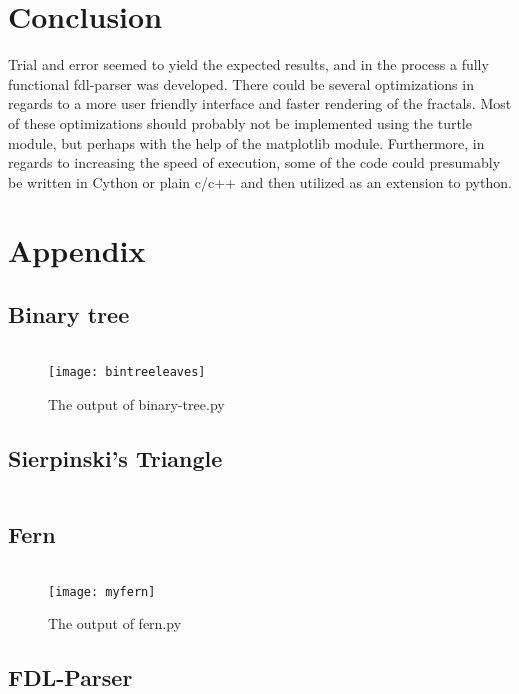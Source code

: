 \documentclass[titlepage]{article}
\begin{document}
\section{Conclusion}
Trial and error seemed to yield the expected results, and in the process a fully functional fdl-parser was developed. There could be several optimizations in regards to a more user friendly interface and faster rendering of the fractals. Most of these optimizations should probably not be implemented using the turtle module, but perhaps with the help of the matplotlib module. Furthermore, in regards to increasing the speed of execution, some of the code could presumably be written in Cython or plain c/c++ and then utilized as an extension to python.

\appendix
\section{Appendix}
\subsection{Binary tree}
\label{app:bintree}
\inputminted{python}{binary-tree.py}
\begin{figure}[H]
  \centering
  \texttt{[image: bintreeleaves]}
  \caption{The output of binary-tree.py}
\end{figure}
\subsection{Sierpinski's Triangle}
\label{app:sierpinski}
\inputminted{python}{sierpinsky-triangle.py}
\subsection{Fern}
\label{app:fern}
\inputminted{python}{fern.py}
\begin{figure}[H]
  \centering
  \texttt{[image: myfern]}
  \caption{The output of fern.py}
\end{figure}
\subsection{FDL-Parser}
\inputminted{python}{fdlParser.py}
\end{document}
